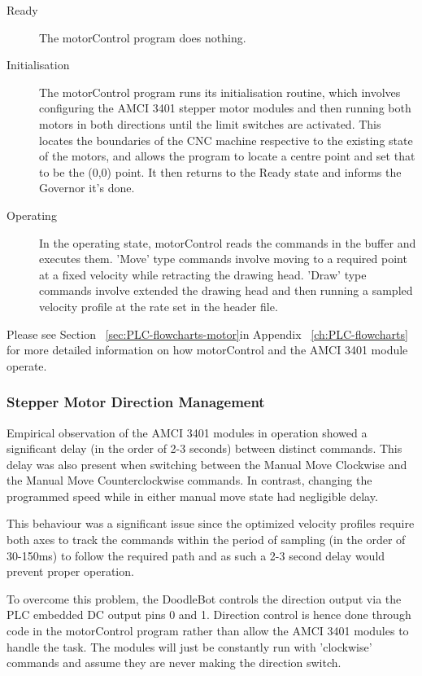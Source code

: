 			\begin{description}
				\item[Ready] The motorControl program does nothing.
				\item[Initialisation] The motorControl program runs its initialisation routine, which involves configuring the AMCI 3401 stepper motor modules and then running both motors in both directions until the limit switches are activated. This locates the boundaries of the CNC machine respective to the existing state of the motors, and allows the program to locate a centre point and set that to be the (0,0) point. It then returns to the Ready state and informs the Governor it's done.
				\item[Operating] In the operating state, motorControl reads the commands in the buffer and executes them. 'Move' type commands involve moving to a required point at a fixed velocity while retracting the drawing head. 'Draw' type commands involve extended the drawing head and then running a sampled velocity profile at the rate set in the header file.
			\end{description}
			
		Please see Section ~\ref{sec:PLC-flowcharts-motor}in Appendix ~\ref{ch:PLC-flowcharts} for more detailed information on how motorControl and the AMCI 3401 module operate.

	\subsubsection{Stepper Motor Direction Management}	
	\label{sec:stepperdirectionmanagement}
			Empirical observation of the AMCI 3401 modules in operation showed a significant delay (in the order of 2-3 seconds) between distinct commands. This delay was also present when switching between the Manual Move Clockwise and the Manual Move Counterclockwise commands. In contrast, changing the programmed speed while in either manual move state had negligible delay.
			
			This behaviour was a significant issue since the optimized velocity profiles require both axes to track the commands within the period of sampling (in the order of 30-150ms) to follow the required path and as such a 2-3 second delay would prevent proper operation.
			
			To overcome this problem, the DoodleBot controls the direction output via the PLC embedded DC output pins 0 and 1. Direction control is hence done  through code in the motorControl program rather than allow the AMCI 3401 modules to handle the task. The modules will just be constantly run with 'clockwise' commands and assume they are never making the direction switch. 
			
